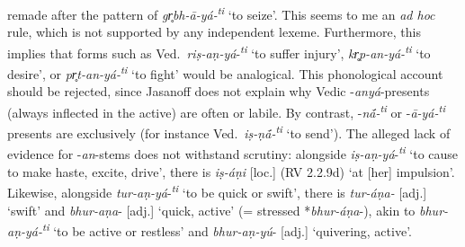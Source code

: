 \documentclass[output=paper,colorlinks,citecolor=brown]{langscibook}
\begin{document}
remade after the pattern of \textit{gr̥bh-ā-yá-\textsuperscript{ti}}  ‘to seize’. This seems to me an \textit{ad hoc} rule, which is not supported by any independent lexeme. Furthermore, this implies that forms such as Ved.\ \textit{riṣ-aṇ-yá}-\textit{\textsuperscript{ti}}  ‘to suffer injury’, \textit{kr̥p-an-yá-\textsuperscript{ti}}  ‘to desire’, or \textit{pr̥t-an-yá-\textsuperscript{ti}}  ‘to fight’ would be analogical. This phonological account should be rejected, since Jasanoff does not explain why Vedic -\textit{anyá}-presents  (always inflected in the active) are often  or labile. By contrast, -\textit{n{ā́}-}\textit{\textsuperscript{ti}}  or -\textit{ā-yá-\textsuperscript{ti}}  presents are exclusively  (for instance Ved.\ \textit{iṣ-ṇ{ā́}-}\textit{\textsuperscript{ti}}  ‘to send’). The alleged lack of evidence for -\textit{an}-stems  does not withstand scrutiny: alongside \textit{iṣ-aṇ-yá}-\textit{\textsuperscript{ti}}  ‘to cause to make haste, excite, drive’, there is \textit{iṣ-áṇi}  [loc.] (RV 2.2.9d) ‘at [her] impulsion’. Likewise, alongside \textit{tur-aṇ-yá}-\textit{\textsuperscript{ti}}  ‘to be quick or swift’, there is \textit{tur-áṇa-}  [adj.] ‘swift’ and \textit{bhur-aṇa}-  [adj.] ‘quick, active’ (= stressed  *\textit{bhur-áṇa}-), akin to \textit{bhur-aṇ-yá-\textsuperscript{ti}}  ‘to be active or restless’ and \textit{bhur-aṇ-yú}-  [adj.] ‘quivering, active’.
\end{document}
